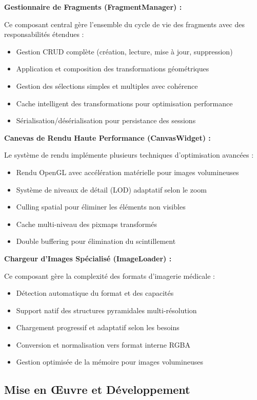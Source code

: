\documentclass[12pt,a4paper]{article}
\begin{document}
\textbf{Gestionnaire de Fragments (FragmentManager) :}

Ce composant central gère l'ensemble du cycle de vie des fragments avec des responsabilités étendues :
\begin{itemize}
\item Gestion CRUD complète (création, lecture, mise à jour, suppression)
\item Application et composition des transformations géométriques
\item Gestion des sélections simples et multiples avec cohérence
\item Cache intelligent des transformations pour optimisation performance
\item Sérialisation/désérialisation pour persistance des sessions
\end{itemize}

\textbf{Canevas de Rendu Haute Performance (CanvasWidget) :}

Le système de rendu implémente plusieurs techniques d'optimisation avancées :
\begin{itemize}
\item Rendu OpenGL avec accélération matérielle pour images volumineuses
\item Système de niveaux de détail (LOD) adaptatif selon le zoom
\item Culling spatial pour éliminer les éléments non visibles
\item Cache multi-niveau des pixmaps transformés
\item Double buffering pour élimination du scintillement
\end{itemize}

\textbf{Chargeur d'Images Spécialisé (ImageLoader) :}

Ce composant gère la complexité des formats d'imagerie médicale :
\begin{itemize}
\item Détection automatique du format et des capacités
\item Support natif des structures pyramidales multi-résolution
\item Chargement progressif et adaptatif selon les besoins
\item Conversion et normalisation vers format interne RGBA
\item Gestion optimisée de la mémoire pour images volumineuses
\end{itemize}

\subsection{Mise en Œuvre et Développement}
\end{document}
